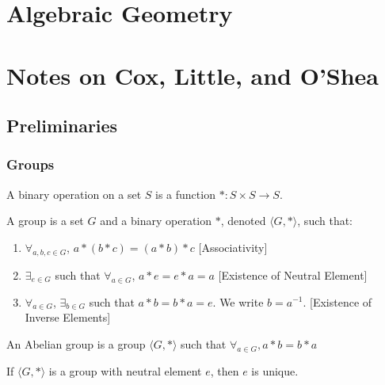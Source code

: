 \documentclass[crop=false,class=article,oneside]{standalone}
\begin{document}
    \ifx\ifmathcoursesalgebraicgeometry\undefined
        \section*{Algebraic Geometry}
        \setcounter{section}{1}
    \else
        \section{Notes on Cox, Little, and O'Shea}
    \fi
    \subsection{Preliminaries}
        \subsubsection{Groups}
            \begin{definition}
                A binary operation on a set $S$ is a
                function $*:S\times S \rightarrow S$.
            \end{definition}
            \begin{definition}
                A group is a set $G$ and a binary operation $*$,
                denoted $\langle G,*\rangle$, such that:
                \begin{enumerate}
                    \item $\forall_{a,b,c\in G}$, $a*(b*c)=(a*b)*c$
                          \hfill[Associativity]
                    \item $\exists_{e\in G}$ such that
                          $\forall_{a\in G}$, $a*e=e*a=a$
                          \hfill[Existence of Neutral Element]
                    \item $\forall_{a\in G}$, $\exists_{b\in G}$
                          such that $a*b=b*a=e$.
                          We write $b=a^{-1}$.
                          \hfill[Existence of Inverse Elements]
                \end{enumerate}
            \end{definition}
            \begin{definition}
                An Abelian group is a group $\langle G,*\rangle$
                such that $\forall_{a\in G},a*b=b*a$
            \end{definition}
            \begin{theorem}
                If $\langle G, *\rangle$ is a group with neutral
                element $e$, then $e$ is unique.
            \end{theorem}
\end{document}
